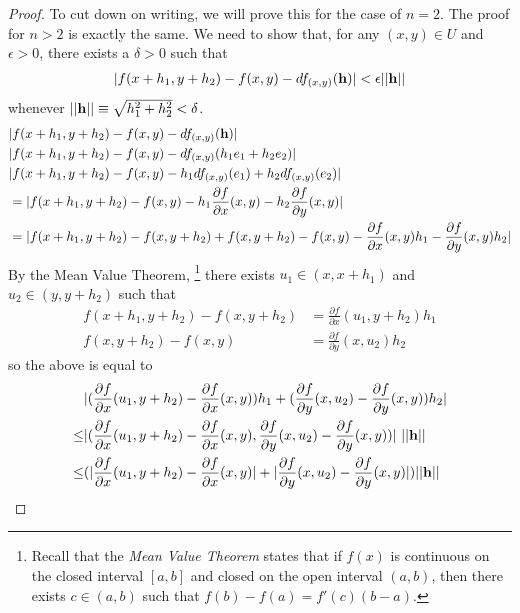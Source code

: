 \documentclass[12pt,letterpaper,reqno]{article}
\numberwithin{equation}{section}
\begin{document}
{\begin{proof}
To cut down on writing, we will prove this for the case of $n=2$. The proof for $n>2$ is exactly the same. We need to show that, for any $(x,y) \in U$ and $\epsilon > 0$, there exists a $\delta > 0$ such that
\begin{align*}
	|f(x+h_1,y+h_2)-f(x,y)-df_{(x,y)}({\bf h})|<\epsilon||{\bf h}||
\end{align*}
whenever $||{\bf h}||\equiv \sqrt{h_1^2+h_2^2}< \delta$.  
\begin{align*}
	&|f(x+h_1,y+h_2)-f(x,y)-df_{(x,y)}({\bf h})|\\
	&|f(x+h_1,y+h_2)-f(x,y)-df_{(x,y)}(h_1e_1+h_2e_2)|\\
	&|f(x+h_1,y+h_2)-f(x,y)-h_1df_{(x,y)}(e_1)+h_2df_{(x,y)}(e_2)|\\
	&=|f(x+h_1,y+h_2)-f(x,y)-h_1\frac{\partial f}{\partial x}(x,y)-h_2\frac{\partial f}{\partial y}(x,y)| \\
	&=|f(x+h_1,y+h_2)-f(x,y+h_2)+f(x,y+h_2)-f(x,y)-\frac{\partial f}{\partial x}(x,y)h_1-\frac{\partial f}{\partial y}(x,y)h_2| \\
\end{align*}
By the Mean Value Theorem, \footnote{Recall that the \emph{Mean Value Theorem} states that if $f(x)$ is continuous on the closed interval $[a,b]$ and closed on the open interval $(a,b)$, then there exists $c \in (a,b)$ such that $f(b)-f(a)=f'(c)(b-a)$.} there exists $u_1 \in (x,x+h_1)$ and $u_2 \in (y,y+h_2)$ such that
\begin{align*}
	f(x+h_1,y+h_2)-f(x,y+h_2)&=\frac{\partial f}{\partial x}(u_1,y+h_2)h_1 \\
	f(x,y+h_2)-f(x,y)&=\frac{\partial f}{\partial y}(x,u_2)h_2
\end{align*}
so the above is equal to
\begin{align*}
	&|(\frac{\partial f}{\partial x}(u_1,y+h_2)-\frac{\partial f}{\partial x}(x,y))h_1+(\frac{\partial f}{\partial y}(x,u_2)-\frac{\partial f}{\partial y}(x,y))h_2|\\
	 \leq &|(\frac{\partial f}{\partial x}(u_1,y+h_2)-\frac{\partial f}{\partial x}(x,y), \frac{\partial f}{\partial y}(x,u_2)-\frac{\partial f}{\partial y}(x,y))| \ ||{\bf h}|| \\
	 \leq &(|\frac{\partial f}{\partial x}(u_1,y+h_2)-\frac{\partial f}{\partial x}(x,y)|+|\frac{\partial f}{\partial y}(x,u_2)-\frac{\partial f}{\partial y}(x,y)|)||{\bf h}||
\end{align*}

\end{proof}}
\end{document}
